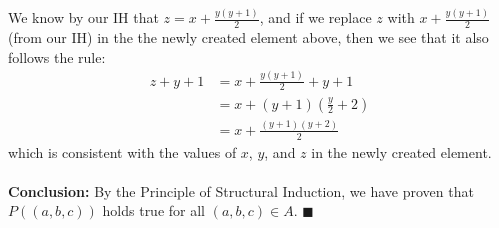 \documentclass{article}
\begin{document}
\begin{enumerate}
	We know by our IH that $z=x+\frac{y(y+1)}{2}$, and if we replace $z$ with $x+\frac{y(y+1)}{2}$ (from our IH) in the the newly created element above, then we see that it also follows the rule: \begin{align*}
		z+y+1&=x+\frac{y(y+1)}{2}+y+1 \\
		&= x+(y+1)(\frac{y}{2}+2) \\
		&= x+\frac{(y+1)(y+2)}{2}
	\end{align*}
	which is consistent with the values of $x$, $y$, and $z$ in the newly created element. \\\\
	\textbf{Conclusion:} By the Principle of Structural Induction, we have proven that $P((a,b,c))$ holds true for all $(a,b,c) \in A$. \null\hfill $\blacksquare$ \\
		
\end{enumerate}
\end{document}
